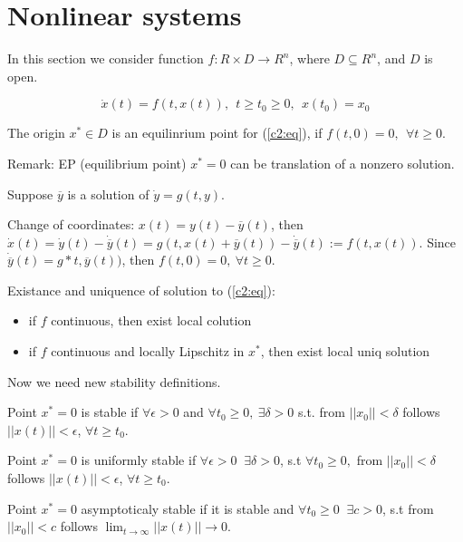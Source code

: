 \section{Nonlinear systems}

In this section we consider function $f:R\times D\rightarrow R^n$,
where $D \subseteq R^n$, and $D$ is open.

\begin{equation}\label{c2:eq}
 \dot x(t)=f(t,x(t)), \ \ t \ge t_0 \ge 0,\ \ x(t_0)=x_0
\end{equation} 

The origin $x^* \in D$ is an equilinrium point for (\ref{c2:eq}),
if $f(t,0)=0, \ \ \forall t \ge 0$.

Remark: EP (equilibrium point) $x^*=0$ can be translation of a nonzero
solution.

Suppose $\overline{y}$ is a solution of $\dot y = g(t, y)$.

Change of coordinates: $x(t)=y(t)-\overline{y}(t)$, then
$\dot x(t) = \dot y(t)-\dot{\overline{y}}(t)=
g(t, x(t)+\overline{y}(t)) - \dot{\overline{y}}(t):=f(t,x(t))$.
Since $\dot{\overline{y}}(t)=g*t,\overline{y}(t))$, then
$f(t,0)=0,\ \forall t \ge 0$.

Existance and uniquence of solution to (\ref{c2:eq}):
\begin{itemize}
 \item if $f$ continuous, then exist local colution
 \item if $f$ continuous and locally Lipschitz in $x^*$, then
 	exist local uniq solution 
\end{itemize}


Now we need new stability definitions.

\begin{Definition}
 Point $x^*=0$ is stable if $\forall \epsilon > 0$ and 
 $\forall t_0 \ge 0,\ \exists \delta>0$ s.t. from $||x_0||<\delta$
 follows $||x(t)|| < \epsilon$, $\forall t  \ge t_0$.
\end{Definition}

\begin{Definition}
 Point $x^*=0$ is uniformly stable if $\forall \epsilon > 0\ $  
 $\exists \delta>0$, s.t $\forall t_0 \ge 0,$ from $||x_0||<\delta$
 follows $||x(t)|| < \epsilon$, $\forall t  \ge t_0$.
\end{Definition}

\begin{Definition}
 Point $x^*=0$ asymptoticaly stable if it is stable and $\forall t_0 \ge 0\ $  
 $\exists c>0$, s.t from $||x_0||<c$
 follows $\lim_{t\to \infty} ||x(t)|| \to 0$.
\end{Definition}

